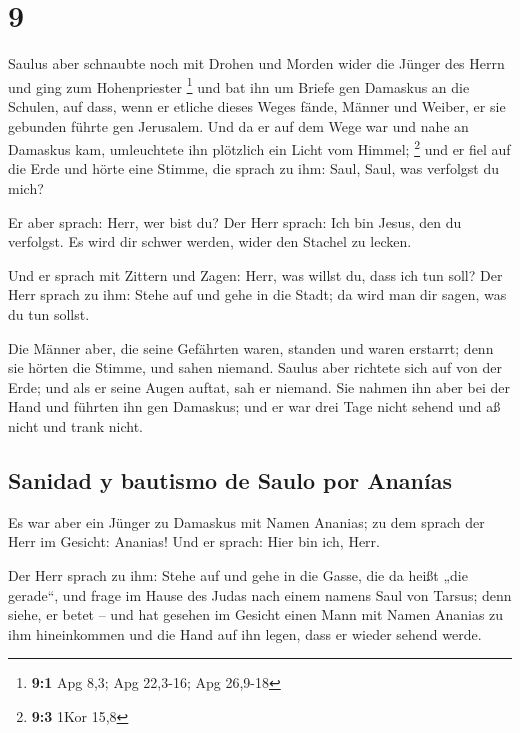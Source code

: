 \hypertarget{section-8}{%
\section{9}\label{section-8}}

 Saulus aber schnaubte noch mit Drohen und Morden wider
die Jünger des Herrn und ging zum Hohenpriester \footnote{\textbf{9:1}
  Apg 8,3; Apg 22,3-16; Apg 26,9-18}  und bat ihn um
Briefe gen Damaskus an die Schulen, auf dass, wenn er etliche dieses
Weges fände, Männer und Weiber, er sie gebunden führte gen Jerusalem.
 Und da er auf dem Wege war und nahe an Damaskus kam,
umleuchtete ihn plötzlich ein Licht vom Himmel; \footnote{\textbf{9:3}
  1Kor 15,8}  und er fiel auf die Erde und hörte eine
Stimme, die sprach zu ihm: Saul, Saul, was verfolgst du mich?

 Er aber sprach: Herr, wer bist du? Der Herr sprach: Ich
bin Jesus, den du verfolgst. Es wird dir schwer werden, wider den
Stachel zu lecken.

 Und er sprach mit Zittern und Zagen: Herr, was willst du,
dass ich tun soll? Der Herr sprach zu ihm: Stehe auf und gehe in die
Stadt; da wird man dir sagen, was du tun sollst.

 Die Männer aber, die seine Gefährten waren, standen und
waren erstarrt; denn sie hörten die Stimme, und sahen niemand.
 Saulus aber richtete sich auf von der Erde; und als er
seine Augen auftat, sah er niemand. Sie nahmen ihn aber bei der Hand und
führten ihn gen Damaskus;  und er war drei Tage nicht
sehend und aß nicht und trank nicht.

\hypertarget{sanidad-y-bautismo-de-saulo-por-ananuxedas}{%
\subsection{Sanidad y bautismo de Saulo por
Ananías}\label{sanidad-y-bautismo-de-saulo-por-ananuxedas}}

 Es war aber ein Jünger zu Damaskus mit Namen Ananias; zu
dem sprach der Herr im Gesicht: Ananias! Und er sprach: Hier bin ich,
Herr.

 Der Herr sprach zu ihm: Stehe auf und gehe in die Gasse,
die da heißt „die gerade``, und frage im Hause des Judas nach einem
namens Saul von Tarsus; denn siehe, er betet --  und hat
gesehen im Gesicht einen Mann mit Namen Ananias zu ihm hineinkommen und
die Hand auf ihn legen, dass er wieder sehend werde.

